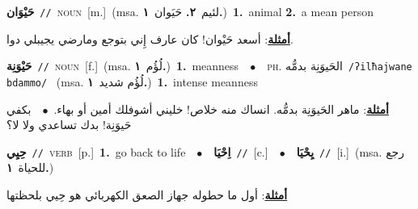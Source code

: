 \documentclass[10pt,a4paper,twoside]{article} %
\begin{document}
\begin{multicols}{2}
{\setlength\topsep{0pt}\textbf{\foreignlanguage{arabic}{حَيْوَان}}\ {\color{gray}\texttt{//}\color{black}}\ \textsc{noun}\ [m.]\ \color{gray}(msa. \foreignlanguage{arabic}{لئيم}~\foreignlanguage{arabic}{\textbf{٢.}}  \foreignlanguage{arabic}{حَيَوان}~\foreignlanguage{arabic}{\textbf{١.}})\color{black}\ \textbf{1.}~animal  \textbf{2.}~a mean person\  \begin{flushright}\color{gray}\foreignlanguage{arabic}{\textbf{\underline{\foreignlanguage{arabic}{أمثلة}}}: أسعد حَيْوان! كان عارف إِني بتوجع ومارضي يجيبلي دوا.}\end{flushright}\color{black}} \vspace{2mm}

{\setlength\topsep{0pt}\textbf{\foreignlanguage{arabic}{حَيْوَنِة}}\ {\color{gray}\texttt{//}\color{black}}\ \textsc{noun}\ [f.]\ \color{gray}(msa. \foreignlanguage{arabic}{لُؤُم}~\foreignlanguage{arabic}{\textbf{١.}})\color{black}\ \textbf{1.}~meanness\ \ $\bullet$\ \ \textsc{ph.} \color{gray} \foreignlanguage{arabic}{الحَيوَنِة بدمُّه}\color{black}\ {\color{gray}\texttt{/{\sffamily ʔilħajwane bdammo}/}\color{black}}\ \color{gray} (msa. \foreignlanguage{arabic}{لُؤُم شديد}~\foreignlanguage{arabic}{\textbf{١.}})\color{black}\ \textbf{1.}~intense meanness\  \begin{flushright}\color{gray}\foreignlanguage{arabic}{\textbf{\underline{\foreignlanguage{arabic}{أمثلة}}}: ماهر الحَيوَنِة بدمُّه. انساك منه خلاص! خليني أشوفلك أمين أو بهاء.\ $\bullet$\ \  بكفي حَيوَنِة! بدك تساعدي ولا لا؟}\end{flushright}\color{black}} \vspace{2mm}

{\setlength\topsep{0pt}\textbf{\foreignlanguage{arabic}{حِيِي}}\ {\color{gray}\texttt{//}\color{black}}\ \textsc{verb}\ [p.]\ \textbf{1.}~go back to life\ \ $\bullet$\ \ \setlength\topsep{0pt}\textbf{\foreignlanguage{arabic}{اِحْيَا}}\ {\color{gray}\texttt{//}\color{black}}\ [c.]\ \ $\bullet$\ \ \setlength\topsep{0pt}\textbf{\foreignlanguage{arabic}{يِحْيَا}}\ {\color{gray}\texttt{//}\color{black}}\ [i.]\ \color{gray}(msa. \foreignlanguage{arabic}{رجع للحياة}~\foreignlanguage{arabic}{\textbf{١.}})\color{black}\  \begin{flushright}\color{gray}\foreignlanguage{arabic}{\textbf{\underline{\foreignlanguage{arabic}{أمثلة}}}: أول ما حطوله جهاز الصعق الكهربائي هو حِيي بلحظتها}\end{flushright}\color{black}} \vspace{2mm}


\end{multicols}
\end{document}

